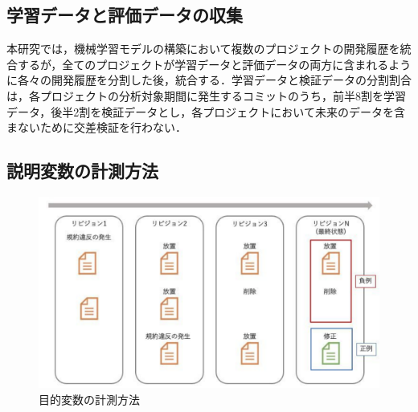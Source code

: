 \documentclass[T,J]{fose} %
\begin{document}

\subsection{学習データと評価データの収集}

本研究では，機械学習モデルの構築において複数のプロジェクトの開発履歴を統合するが，全てのプロジェクトが学習データと評価データの両方に含まれるように各々の開発履歴を分割した後，統合する．学習データと検証データの分割割合は，各プロジェクトの分析対象期間に発生するコミットのうち，前半8割を学習データ，後半2割を検証データとし，各プロジェクトにおいて未来のデータを含まないために交差検証を行わない．

\subsection{説明変数の計測方法}

\begin{figure}[t]
	\centering
	\includegraphics[width=1.0\linewidth]{Kameoka_fig/mokutekihensu.pdf}
	\caption{目的変数の計測方法}
	\label{fig:mokutekihensu}
\end{figure}
\end{document}

